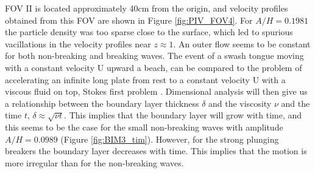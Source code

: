 \documentclass[a4paper, 11pt, english, twoside, openright]{article}
\begin{document}
FOV II is located approximately 40cm from the origin, and velocity 
profiles obtained from this FOV are shown in Figure \ref{fig:PIV_FOV4}.
For $A/H=0.1981$ the particle density was too sparse close to the surface, which led to spurious vacillations in the velocity profiles near  $z\approx1$. 
 An outer flow seems to be constant for both non-breaking and breaking waves. The event of a swash tongue moving with a constant velocity U upward a beach, can be compared to the problem of accelerating an infinite long plate from rest to a constant velocity U with a viscous fluid on top, Stokes first problem \citep{white2006viscous}. Dimensional analysis will then give us a relationship between the boundary layer thickness $\delta $ and the viscosity $\nu$ and the time $t$,  $\delta \approx \sqrt{\nu t}$.  This implies that the boundary layer will grow with time, and this seems to be the case for the small non-breaking waves with amplitude  $A/H=0.0989$ (Figure \ref{fig:BIM3_tim}). However, for the strong plunging breakers the boundary layer decreases with time. This implies that the motion is more  irregular than for the non-breaking waves. %
\end{document}

